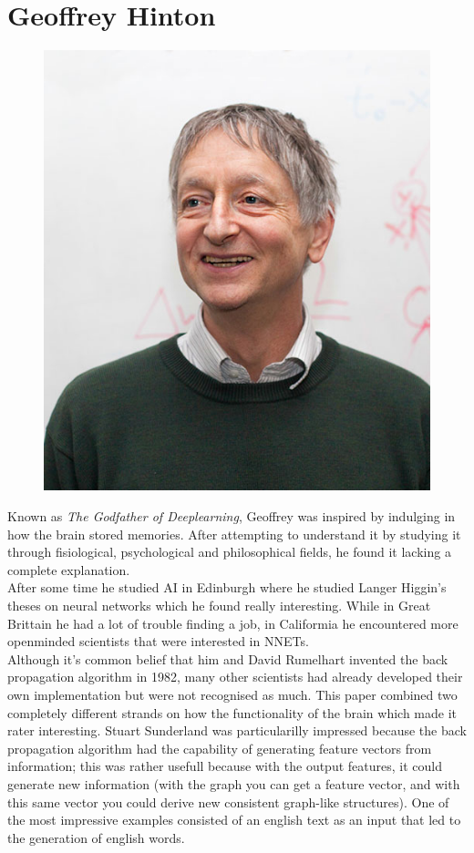 \documentclass[11pt]{report}
\begin{document}
\section{Geoffrey Hinton}
\begin{figure}
\includegraphics[width=0.9\linewidth]{GeoffH.jpeg} 
\end{figure}
Known as \textit{The Godfather of Deeplearning}, Geoffrey was inspired by indulging in how the brain stored memories. After attempting to understand it by studying it through fisiological, psychological and philosophical fields, he found it lacking a complete explanation.\\
After some time he studied AI in Edinburgh where he studied Langer Higgin's theses on neural networks which he found really interesting. While in Great Brittain he had a lot of trouble finding a job, in Califormia he encountered more openminded scientists that were interested in NNETs.\\
Although it's common belief that him and David Rumelhart invented the back propagation algorithm in 1982, many other scientists had already developed their own implementation but were not recognised as much. This paper combined two completely different strands on how the functionality of the brain which made it rater interesting. Stuart Sunderland was particularilly impressed because the back propagation algorithm had the capability of generating feature vectors from information; this was rather usefull because with the output features, it could generate new information (with the graph you can get a feature vector, and with this same vector you could derive new consistent graph-like structures). One of the most impressive examples consisted of an english text as an input that led to the generation of english words.\\
\end{document}
